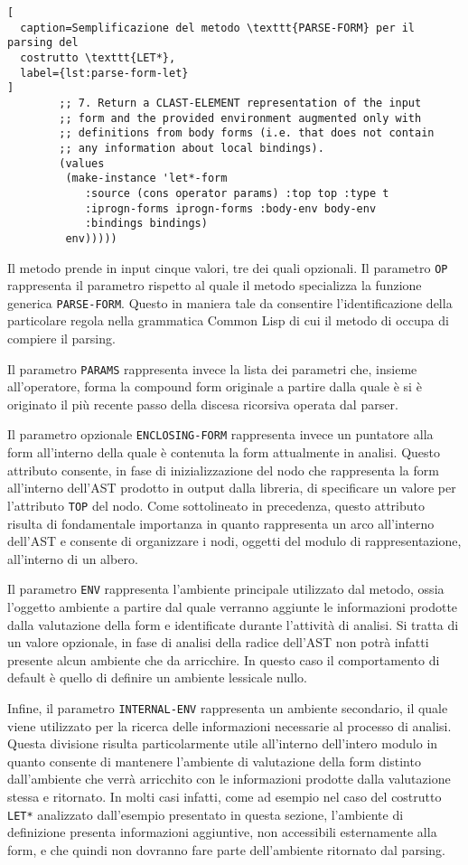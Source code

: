 \begin{lstlisting}[
  caption=Semplificazione del metodo \texttt{PARSE-FORM} per il parsing del
  costrutto \texttt{LET*},
  label={lst:parse-form-let}
]
        ;; 7. Return a CLAST-ELEMENT representation of the input
        ;; form and the provided environment augmented only with
        ;; definitions from body forms (i.e. that does not contain
        ;; any information about local bindings).
        (values
         (make-instance 'let*-form
            :source (cons operator params) :top top :type t
            :iprogn-forms iprogn-forms :body-env body-env
            :bindings bindings)
         env)))))

\end{lstlisting}

Il metodo prende in input cinque valori, tre dei quali opzionali. Il parametro
\texttt{OP} rappresenta il parametro rispetto al quale il metodo specializza la
funzione generica \texttt{PARSE-FORM}. Questo in maniera tale da consentire
l'identificazione della particolare regola nella grammatica Common Lisp di cui
il metodo di occupa di compiere il parsing.

Il parametro \texttt{PARAMS} rappresenta invece la lista dei parametri che,
insieme all'operatore, forma la compound form originale a partire dalla quale è
si è originato il più recente passo della discesa ricorsiva operata dal parser.

Il parametro opzionale \texttt{ENCLOSING-FORM} rappresenta invece un puntatore
alla form all'interno della quale è contenuta la form attualmente in analisi.
Questo attributo consente, in fase di inizializzazione del nodo che rappresenta
la form all'interno dell'AST prodotto in output dalla libreria, di specificare
un valore per l'attributo \texttt{TOP} del nodo. Come sottolineato in
precedenza, questo attributo risulta di fondamentale importanza in quanto
rappresenta un arco all'interno dell'AST e consente di organizzare i nodi,
oggetti del modulo di rappresentazione, all'interno di un albero.

Il parametro \texttt{ENV} rappresenta l'ambiente principale utilizzato dal
metodo, ossia l'oggetto ambiente a partire dal quale verranno aggiunte le
informazioni prodotte dalla valutazione della form e identificate durante
l'attività di analisi. Si tratta di un valore opzionale, in fase di analisi
della radice dell'AST non potrà infatti presente alcun ambiente che da
arricchire. In questo caso il comportamento di default è quello di definire un
ambiente lessicale nullo.

Infine, il parametro \texttt{INTERNAL-ENV} rappresenta un ambiente secondario,
il quale viene utilizzato per la ricerca delle informazioni necessarie al
processo di analisi. Questa divisione risulta particolarmente utile all'interno
dell'intero modulo in quanto consente di mantenere l'ambiente di valutazione
della form distinto dall'ambiente che verrà arricchito con le informazioni
prodotte dalla valutazione stessa e ritornato. In molti casi infatti, come ad
esempio nel caso del costrutto \texttt{LET*} analizzato dall'esempio presentato
in questa sezione, l'ambiente di definizione presenta informazioni aggiuntive,
non accessibili esternamente alla form, e che quindi non dovranno fare parte
dell'ambiente ritornato dal parsing.

